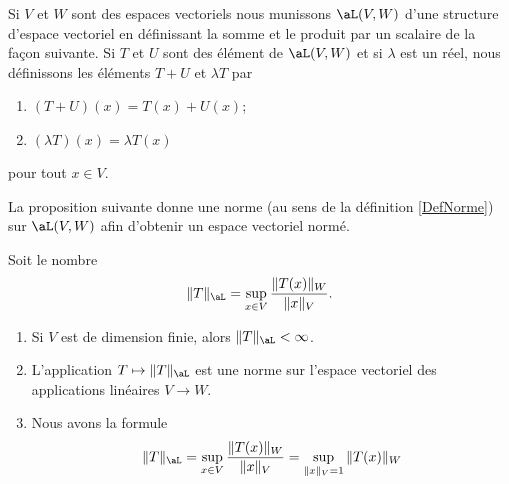 \begin{definition}  \label{DefDQRooVGbzSm}
    Si \( V\) et \( W\) sont des espaces vectoriels nous munissons \( \aL(V,W)\) d'une structure d'espace vectoriel en définissant la somme et le produit par un scalaire de la façon suivante. Si $T$ et $U$ sont des élément de $\aL(V,W)$ et si $\lambda$ est un réel, nous définissons les éléments $T+U$ et $\lambda T$ par
    \begin{enumerate}
        \item
            $(T+U)(x)=T(x)+U(x)$;
        \item
            $(\lambda T)(x)=\lambda T(x)$
    \end{enumerate}
    pour tout \( x\in V\).
\end{definition}

La proposition suivante donne une norme (au sens de la définition \ref{DefNorme}) sur $\aL(V,W)$ afin d'obtenir un espace vectoriel normé.
\begin{proposition}		\label{PropNormeAppLineaire}
    Soit le nombre
	\begin{equation}
        \|T\|_{\aL}=\sup_{x\in V}\frac{\|T(x)\|_{W}}{\|x\|_{V}}.
	\end{equation}
    \begin{enumerate}
        \item
            Si \( V\) est de dimension finie, alors \( \| T \|_{\aL}<\infty\).
        \item
            L'application \( T\mapsto\| T \|_{\aL}\) est une norme sur l'espace vectoriel des applications linéaires \( V\to W\).
        \item
            Nous avons la formule
            \begin{equation}    \label{EqFZPooIoecGH}
                \| T \|_{\aL}=\sup_{x\in V}\frac{\|T(x)\|_{W}}{\|x\|_{V}} =\sup_{\|x\|_{V}=1}\|T(x)\|_{W}
            \end{equation}
    \end{enumerate}
\end{proposition}

